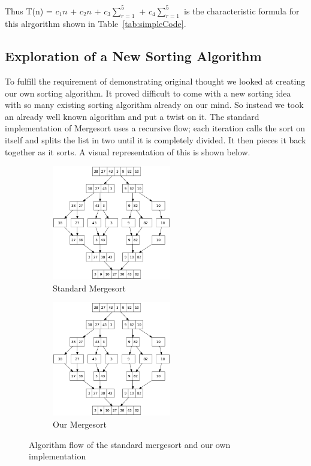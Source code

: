 \documentclass[12pt]{article}
\begin{document}
	
	Thus T(n) = $c_1n$ + $c_2n$ + $c_3\sum_{r=1}^{5}$ + $c_4\sum_{r=1}^{5}$ is the characteristic formula for this alrgorithm shown in Table~\ref{tab:simpleCode}.
	
	\subsection{Exploration of a New Sorting Algorithm}
	
	
	To fulfill the requirement of demonstrating original thought we looked at creating our own sorting algorithm.
	 It proved difficult to come with a new sorting idea with so many existing sorting algorithm already on our mind.
	So instead we took an already well known algorithm and put a twist on it. 
	The standard implementation of Mergesort uses a recursive flow; each iteration calls the sort on itself and splits the list in two until it is completely divided. 
	It then pieces it back together as it sorts. 
	A visual representation of this is shown below.
	
	
\begin{figure}[H]
	
	\begin{subfigure}{0.5\textwidth}
		\includegraphics[width=0.9\linewidth, height=5cm]{Merge_sort_algorithm_diagram.png} 
		\caption{Standard Mergesort}
		\label{fig:stdmerge}
	\end{subfigure}
	\begin{subfigure}{0.5\textwidth}
		\includegraphics[width=0.9\linewidth, height=5cm]{Merge_sort_algorithm_diagram.png}
		\caption{Our Mergesort}
		\label{fig:newmerge}
	\end{subfigure}
	
	\caption{Algorithm flow of the standard mergesort and our own implementation}
	\label{fig:bothmerge}
\end{figure}
	
\end{document}
